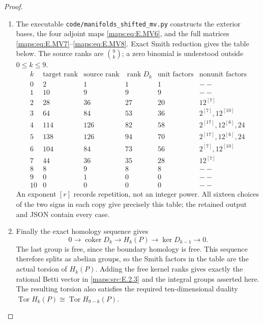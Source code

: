 \begin{proof}
\begin{enumerate}[label=\arabic*.,leftmargin=*]
\item The executable \texttt{code/manifolds\_shifted\_mv.py} constructs
the exterior bases, the four adjoint maps \eqref{maps:eq:E.MV6}, and the full
matrices \eqref{maps:eq:E.MV7}--\eqref{maps:eq:E.MV8}. Exact Smith reduction gives the table
below. The source ranks are $\binom9k$; a zero binomial is
understood outside $0\leq k\leq9$.
\[
 \begin{array}{c|rrrr|l}
 k&\text{target rank}&\text{source rank}&\operatorname{rank}D_k&
       \text{unit factors}&\text{nonunit factors}\\\hline
 0&2&1&1&1&--\\
 1&10&9&9&9&--\\
 2&28&36&27&20&12^{[7]}\\
 3&64&84&53&36&2^{[7]},12^{[10]}\\
 4&114&126&82&58&2^{[17]},12^{[6]},24\\
 5&138&126&94&70&2^{[17]},12^{[6]},24\\
 6&104&84&73&56&2^{[7]},12^{[10]}\\
 7&44&36&35&28&12^{[7]}\\
 8&8&9&8&8&--\\
 9&0&1&0&0&--\\
 10&0&0&0&0&--
 \end{array}
\]
An exponent $[r]$ records repetition, not an integer power.
All sixteen choices of the two signs in each copy give precisely
this table; the retained output and JSON contain every case.

\item Finally the exact homology sequence gives
\[
 0\longrightarrow\operatorname{coker}D_k
 \longrightarrow H_k(P)
 \longrightarrow\ker D_{k-1}\longrightarrow0.
\]
The last group is free, since the boundary homology is free.
This sequence therefore splits as abelian groups, so the Smith
factors in the table are the actual torsion of $H_k(P)$.
Adding the free kernel ranks gives exactly the rational Betti
vector in \ref{maps:src:E.2.3} and the integral groups asserted here.
The resulting torsion also satisfies the required ten-dimensional
duality $\operatorname{Tor}H_k(P)\cong
\operatorname{Tor}H_{9-k}(P)$.
\end{enumerate}
\end{proof}

